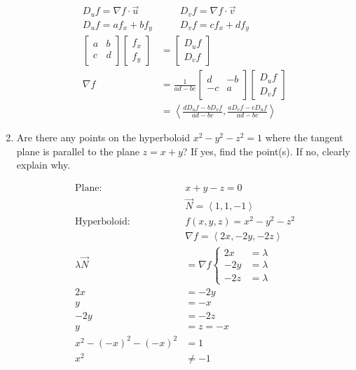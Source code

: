 \documentclass[11pt]{article}
\begin{document}
\begin{enumerate}
  \begin{align*}
    D_uf = \nabla f \cdot \vec{u} &\qquad D_vf = \nabla f \cdot \vec{v} \\
    D_uf = a f_x + b f_y &\qquad D_vf = c f_x + d f_y \\
    \begin{bmatrix}
      a & b \\
      c & d \\
    \end{bmatrix}
    \begin{bmatrix}
      f_x \\ f_y
    \end{bmatrix}
    &=
      \begin{bmatrix}
        D_uf \\ D_v f
      \end{bmatrix} \\
    \nabla f
    &=
      \frac{1}{ad - bc}
      \begin{bmatrix}
        d & -b \\
        -c & a \\
      \end{bmatrix}
      \begin{bmatrix}
        D_uf \\ D_v f
      \end{bmatrix} \\
    &= \left< \frac{d D_uf - b D_vf}{ad - bc}, \frac{a D_vf - c D_uf}{ad - bc} \right>
  \end{align*}

\item Are there any points on the hyperboloid \(x^2 - y^2 - z^2 = 1\) where
  the tangent plane is parallel to the plane \(z = x + y\)? If yes, find
  the point(s). If no, clearly explain why.

  \begin{align*}
    \text{Plane: }& x + y - z = 0 \\
                  &\vec{N} = \left< 1, 1, -1 \right> \\
    \text{Hyperboloid: }& f(x, y, z) = x^2 - y^2 - z^2 \\
                  &\nabla f = \left< 2x, -2y, -2z \right> \\
    \lambda\vec{N} &= \nabla f
                     \begin{cases}
                       2x &= \lambda \\
                       -2y &= \lambda \\
                       -2z &= \lambda
                     \end{cases} \\
    2x &= -2y \\
    y &= -x \\
    -2y &= -2z \\
    y &= z = -x \\
    x^2 - (-x)^2 - (-x)^2 &= 1 \\
    x^2 &\neq -1
  \end{align*}


\end{enumerate}
\end{document}
